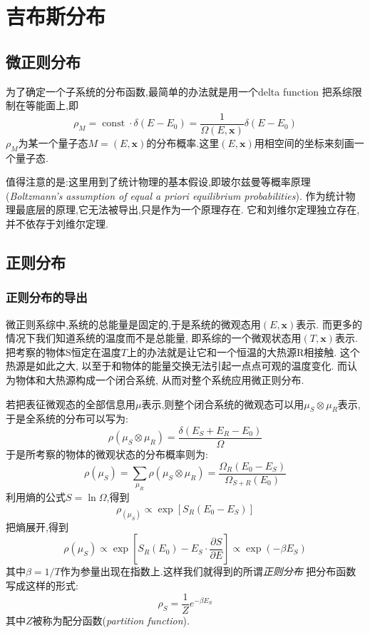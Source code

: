 
\section{吉布斯分布}
\subsection{微正则分布}
  为了确定一个子系统的分布函数,最简单的办法就是用一个delta function 把系综限制在等能面上,即
  \[\rho_M=\operatorname{const}\cdot \delta(E-E_0)=\frac{1}{\Omega(E,\mathbf{x})}\delta(E-E_0)\]
  $\rho_M$为某一个量子态$M=(E,\mathbf{x})$的分布概率.这里$(E,\mathbf{x})$用相空间的坐标来刻画一个量子态.
  
  值得注意的是:这里用到了统计物理的基本假设,即玻尔兹曼等概率原理(\emph{Boltzmann's assumption of equal a priori equilibrium probabilities}). 作为统计物理最底层的原理,它无法被导出,只是作为一个原理存在. 它和刘维尔定理独立存在, 并不依存于刘维尔定理. 

\subsection{正则分布}
\subsubsection{正则分布的导出}
  微正则系综中,系统的总能量是固定的,于是系统的微观态用$(E,\mathbf{x})$表示. 而更多的情况下我们知道系统的温度而不是总能量, 即系综的一个微观状态用$(T,\mathbf{x})$表示. 把考察的物体S恒定在温度$T$上的办法就是让它和一个恒温的大热源R相接触. 这个热源是如此之大, 以至于和物体的能量交换无法引起一点点可观的温度变化. 而认为物体和大热源构成一个闭合系统, 从而对整个系统应用微正则分布. 

  若把表征微观态的全部信息用$\mu$表示,则整个闭合系统的微观态可以用$\mu_S \otimes \mu_R$表示, 于是全系统的分布可以写为:
  \begin{equation}
    \rho(\mu_S \otimes \mu_R)=\dfrac{\delta(E_S+E_R-E_0)}{\Omega}
  \end{equation}
  于是所考察的物体的微观状态的分布概率则为:
  \[\rho(\mu_S)=\sum_{\mu_R}\rho(\mu_S \otimes \mu_R)=\dfrac{\Omega_R(E_0-E_S)}{\Omega_{S+R}(E_0)}\]
  利用熵的公式$S=\ln\Omega$,得到
  \[\rho_(\mu_S) \propto \exp[S_R(E_0-E_S)] \]
  把熵展开,得到 
  \[\rho(\mu_S) \propto \exp\left[S_R(E_0)-E_S\cdot \dfrac{\partial S}{\partial E}\right] \propto \exp(-\beta E_S)\]
  其中$\beta=1 / T$作为参量出现在指数上.这样我们就得到的所谓\emph{正则分布}
  把分布函数写成这样的形式:
  \begin{equation}
    \rho_S=\frac{1}{Z}e^{-\beta E_S}
  \end{equation}
  其中$Z$被称为配分函数(\emph{partition function}). 
  
